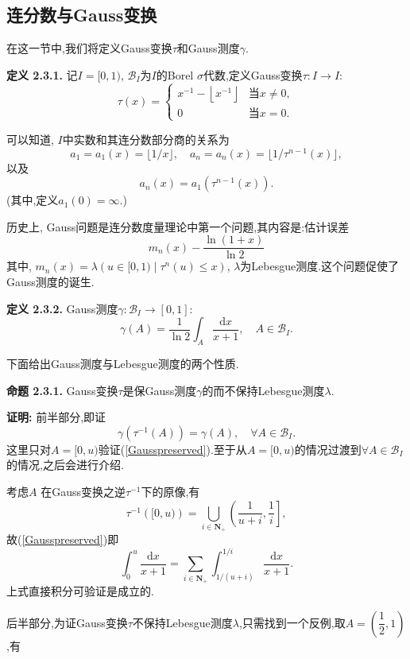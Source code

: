 \subsection{连分数与Gauss变换}
在这一节中,我们将定义Gauss变换$\tau$和Gauss测度$\gamma$.\par
\textbf{定义 2.3.1.  }
记$I=[0,1)$, $\mathcal{B}_I$为$I$的Borel $\sigma$代数,定义Gauss变换$\tau:I\to I:$
$$
\tau\left(x\right)=\left\{
\begin{array}{cc}
x^{-1}-\left\lfloor x^{-1}\right\rfloor&\text{当}x\neq0,\\
0&\text{当}x=0.\end{array}\right.
$$
\par
可以知道, $I$中实数和其连分数部分商的关系为
$$a_1=a_1(x)=\lfloor1/x\rfloor,\quad a_n=a_n(x)=\lfloor1/\tau^{n-1}(x)\rfloor,$$
以及
\begin{equation}\label{tauandinquo}
a_n\left(x\right)=a_1\left(\tau^{n-1}\left(x\right)\right).
\end{equation}
(其中,定义$a_1(0)=\infty$.)\par
历史上, Gauss问题是连分数度量理论中第一个问题,其内容是:估计误差
$$m_n(x)-\frac{\ln(1+x)}{\ln{2}}$$
其中, $m_n(x)=\lambda({u\in[0,1)\mid\tau^n(u)\leqslant x})$, $\lambda$为Lebesgue测度.这个问题促使了Gauss测度的诞生.\par
\textbf{定义 2.3.2.  }
Gauss测度$\gamma:\mathcal{B}_I\to[0,1]:$
$$\gamma\left(A\right)=\frac{1}{\ln2}\int_A\frac{\mathrm{d}x}{x+1},\quad A\in\mathcal{B}_I.$$
\par
下面给出Gauss测度与Lebesgue测度的两个性质.\par
\textbf{命题 2.3.1.  }\textsuperscript{\cite{Iosifescu}}
Gauss变换$\tau$是保Gauss测度$\gamma$的而不保持Lebesgue测度$\lambda$.
\par
\textbf{证明:  }
前半部分,即证
\begin{equation}\label{Gausspreserved}
\gamma\left(\tau^{-1}(A)\right)=\gamma(A),\quad \forall A\in\mathcal{B}_I.
\end{equation}
这里只对$A=[0,u)$验证(\ref{Gausspreserved}).至于从$A=[0,u)$的情况过渡到$\forall A\in\mathcal{B}_I$的情况,之后会进行介绍.\par
考虑$A$
在Gauss变换之逆$\tau^{-1}$下的原像,有
$$\tau^{-1}\left([0,u)\right)=\bigcup_{i\in\mathbf{N}_+}\left(\frac{1}{u+i},\frac{1}{i}\right],$$
故(\ref{Gausspreserved})即
$$\int_0^u\frac{\mathrm{d}x}{x+1}=\sum\limits_{i\in\mathbf{N}_+}\int_{1/(u+i)}^{1/i}\frac{\mathrm{d}x}{x+1}.$$
上式直接积分可验证是成立的.
\par
后半部分,为证Gauss变换$\tau$不保持Lebesgue测度$\lambda$,只需找到一个反例,取$A=(\dfrac{1}{2},1)$,有
